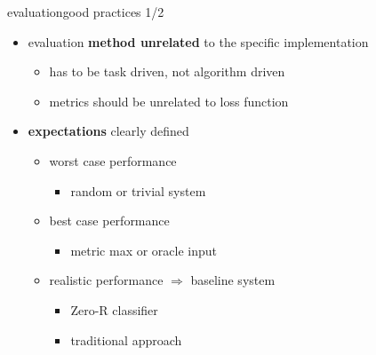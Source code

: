         \begin{frame}{evaluation}{good practices 1/2}
           \begin{itemize}
                \item   evaluation \textbf{method unrelated} to the specific implementation
                    \begin{itemize}
                        \item   has to be task driven, not algorithm driven
                        \item   metrics should be unrelated to loss function
                    \end{itemize}
                \bigskip
                \item<2->   \textbf{expectations} clearly defined
                    \begin{itemize}
                        \item   worst case performance
                            \begin{itemize}
                                \item   random or trivial system
                            \end{itemize}
                        \smallskip
                        \item   best case performance
                            \begin{itemize}
                                \item   metric max or oracle input
                            \end{itemize}
                        \smallskip
                        \item   realistic performance $\Rightarrow$ baseline system
                            \begin{itemize}
                                \item   Zero-R classifier
                                \item   traditional approach
                            \end{itemize}
                    \end{itemize}
            \end{itemize}
        \end{frame}
